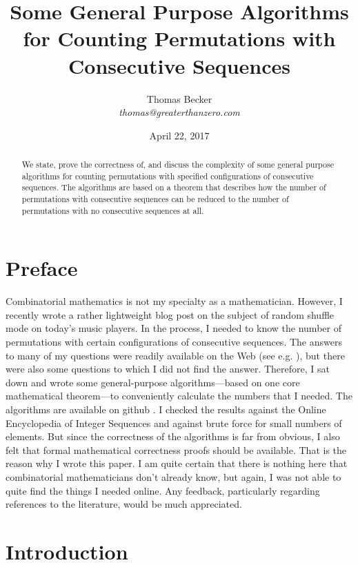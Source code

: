 \documentclass{article}
\begin{document}
\author{Thomas Becker\\ {\small \it thomas@greaterthanzero.com}}
\title{Some General Purpose Algorithms for Counting Permutations with Consecutive Sequences}
\date{\small April 22, 2017}
\maketitle

\begin{abstract}
  We state, prove the correctness of, and discuss the complexity of some general
  purpose algorithms for counting permutations with specified configurations of
  consecutive sequences. The algorithms are based on a theorem that describes how
  the number of permutations with consecutive sequences can be reduced to the number of
  permutations with no consecutive sequences at all.
\end{abstract}

\section{Preface}
Combinatorial mathematics is not my specialty as a mathematician. However, I recently wrote
a rather lightweight blog post \cite{BlogPost} on the subject of random shuffle mode on today's
music players. In the process, I needed to know the number of permutations with certain
configurations of consecutive sequences. The answers to many of my questions were readily
available on the Web (see e.g. \cite{Oeis}),
but there were also some questions to which I did not find the answer. Therefore, I sat down
and wrote some general-purpose algorithms---based on one core mathematical theorem---to conveniently
calculate the numbers that I needed. The algorithms are available on github \cite{Algos}.
I checked the results against the Online Encyclopedia of Integer Sequences \cite{Oeis} and
against brute force for small numbers of elements. But since the correctness of the algorithms
is far from obvious, I also felt that formal mathematical correctness proofs should be available.
That is the reason why I wrote this paper. I am quite certain that there is nothing here that
combinatorial mathematicians don't already know, but again, I was not able to quite find the things I
needed online. Any feedback, particularly regarding references to
the literature, would be much appreciated.

\section{Introduction}
\end{document}
